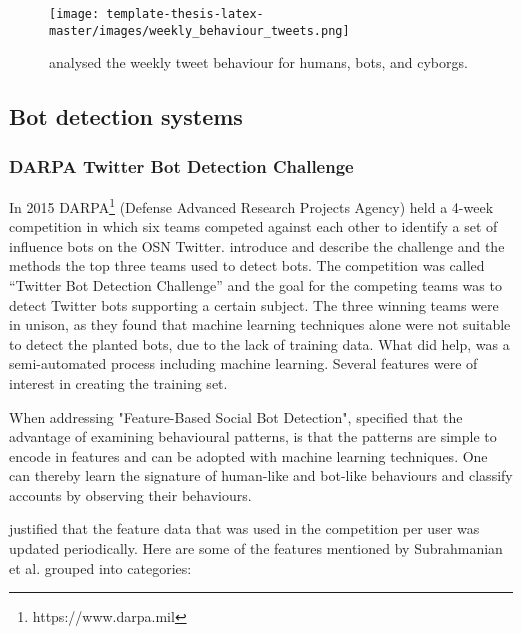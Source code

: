         \begin{figure}[h]
        	\centering
        	\texttt{[image: template-thesis-latex-master/images/weekly\_behaviour\_tweets.png]}
        	\caption{\textcite[818]{DetectingAutomation} analysed the weekly tweet behaviour for humans, bots, and cyborgs.
        	}
        	\label{figure:humanBotCyborgWeekly}
        \end{figure}
        






\subsection{Bot detection systems}

    \subsubsection{DARPA Twitter Bot Detection Challenge}
    \label{subsubsection:DARPA}    
    In 2015 DARPA\footnote{https://www.darpa.mil} (Defense Advanced Research Projects Agency) held a 4-week competition in which six teams competed against each other to identify a set of influence bots on the OSN Twitter. \textcite[39-40]{theDarpaTwitterBotChallenge} introduce and describe the challenge and the methods the top three teams used to detect bots. The competition was called “Twitter Bot Detection Challenge” and the goal for the competing teams was to detect Twitter bots supporting a certain subject. 
    The three winning teams were in unison, as they found that machine learning techniques alone were not suitable to detect the planted bots, due to the lack of training data. What did help, was a semi-automated process including machine learning. Several features were of interest in creating the training set. 
    
    When addressing "Feature-Based Social Bot Detection", \textcite[101]{RiseOfSocialBots} specified that the advantage of examining behavioural patterns, is that the patterns are simple to encode in features and can be adopted with machine learning techniques. One can thereby learn the signature of human-like and bot-like behaviours and classify accounts by observing their behaviours.
    
    \textcite[40-42]{theDarpaTwitterBotChallenge} justified that the feature data that was used in the competition per user was updated periodically. Here are some of the features mentioned by Subrahmanian et al. grouped into categories:
    
